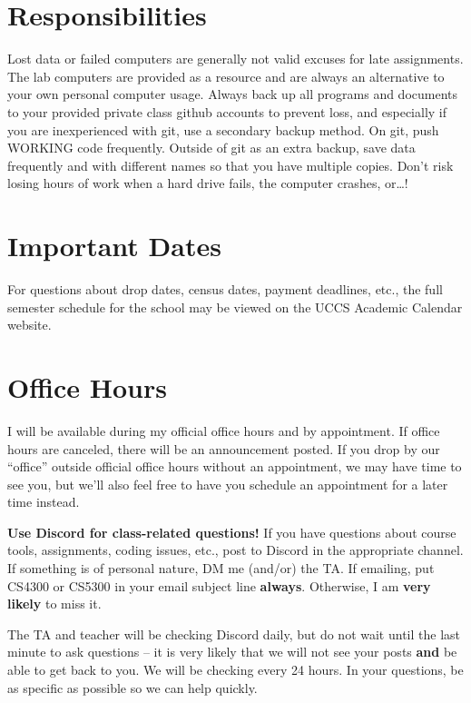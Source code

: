 \documentclass[11pt]{article}
\begin{document}
\section*{Responsibilities}

Lost data or failed computers are generally not valid excuses for late assignments. The lab computers are provided as a resource and are always an alternative to your own personal computer usage. Always back up all programs and documents to your provided private class github accounts to prevent loss, and especially if you are inexperienced with git, use a secondary backup method. On git, push WORKING code frequently. Outside of git as an extra backup, save data frequently and with different names so that you have multiple copies. Don't risk losing hours of work when a hard drive fails, the computer crashes, or\ldots!

\section*{Important Dates}

For questions about drop dates, census dates, payment deadlines, etc., the full semester schedule for the school may be viewed on the UCCS Academic Calendar website.

\section*{Office Hours}

I will be available during my official office hours and by appointment. If office hours are canceled, there will be an announcement posted. If you drop by our ``office'' outside official office hours without an appointment, we may have time to see you, but we'll also feel free to have you schedule an appointment for a later time instead.

\textbf{Use Discord for class-related questions!} If you have questions about course tools, assignments, coding issues, etc., post to Discord in the appropriate channel. If something is of personal nature, DM me (and/or) the TA. If emailing, put CS4300 or CS5300 in your email subject line \textbf{always}. Otherwise, I am \textbf{very likely} to miss it.

The TA and teacher will be checking Discord daily, but do not wait until the last minute to ask questions -- it is very likely that we will not see your posts \textbf{and} be able to get back to you. We will be checking every 24 hours. In your questions, be as specific as possible so we can help quickly.
\end{document}
